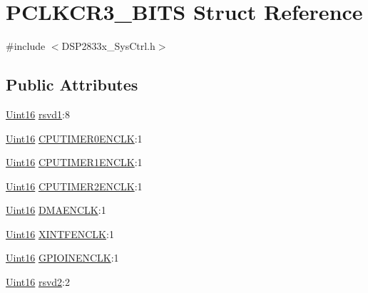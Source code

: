 \hypertarget{struct_p_c_l_k_c_r3___b_i_t_s}{}\section{P\+C\+L\+K\+C\+R3\+\_\+\+B\+I\+T\+S Struct Reference}
\label{struct_p_c_l_k_c_r3___b_i_t_s}


{\ttfamily \#include $<$D\+S\+P2833x\+\_\+\+Sys\+Ctrl.\+h$>$}

\subsection*{Public Attributes}
\begin{DoxyCompactItemize}
\item 
\hyperlink{_d_s_p2833x___device_8h_a59a9f6be4562c327cbfb4f7e8e18f08b}{Uint16} \hyperlink{struct_p_c_l_k_c_r3___b_i_t_s_a03d9795fea738b33c075dd55ed8f6e0b}{rsvd1}\+:8
\item 
\hyperlink{_d_s_p2833x___device_8h_a59a9f6be4562c327cbfb4f7e8e18f08b}{Uint16} \hyperlink{struct_p_c_l_k_c_r3___b_i_t_s_a449cafb3a2d36d7847f8c707a86d2658}{C\+P\+U\+T\+I\+M\+E\+R0\+E\+N\+C\+L\+K}\+:1
\item 
\hyperlink{_d_s_p2833x___device_8h_a59a9f6be4562c327cbfb4f7e8e18f08b}{Uint16} \hyperlink{struct_p_c_l_k_c_r3___b_i_t_s_aac7aea219526dc1458fbf46bc404122f}{C\+P\+U\+T\+I\+M\+E\+R1\+E\+N\+C\+L\+K}\+:1
\item 
\hyperlink{_d_s_p2833x___device_8h_a59a9f6be4562c327cbfb4f7e8e18f08b}{Uint16} \hyperlink{struct_p_c_l_k_c_r3___b_i_t_s_a6b4c50852bde2078572c1c773c10c3ba}{C\+P\+U\+T\+I\+M\+E\+R2\+E\+N\+C\+L\+K}\+:1
\item 
\hyperlink{_d_s_p2833x___device_8h_a59a9f6be4562c327cbfb4f7e8e18f08b}{Uint16} \hyperlink{struct_p_c_l_k_c_r3___b_i_t_s_a929b34b3020a8ccab982c9f787a7b13d}{D\+M\+A\+E\+N\+C\+L\+K}\+:1
\item 
\hyperlink{_d_s_p2833x___device_8h_a59a9f6be4562c327cbfb4f7e8e18f08b}{Uint16} \hyperlink{struct_p_c_l_k_c_r3___b_i_t_s_a7893134f3d929355272de81842170ecf}{X\+I\+N\+T\+F\+E\+N\+C\+L\+K}\+:1
\item 
\hyperlink{_d_s_p2833x___device_8h_a59a9f6be4562c327cbfb4f7e8e18f08b}{Uint16} \hyperlink{struct_p_c_l_k_c_r3___b_i_t_s_a4243da3d97fc134f50b6d619f6bf542a}{G\+P\+I\+O\+I\+N\+E\+N\+C\+L\+K}\+:1
\item 
\hyperlink{_d_s_p2833x___device_8h_a59a9f6be4562c327cbfb4f7e8e18f08b}{Uint16} \hyperlink{struct_p_c_l_k_c_r3___b_i_t_s_a0cb9702a834a566cd007240c944204cb}{rsvd2}\+:2
\end{DoxyCompactItemize}


